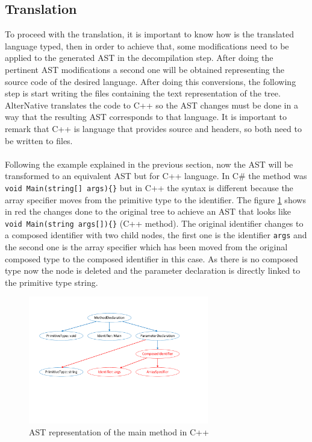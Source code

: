 \subsection{Translation}\label{SS:AN-Process-Translation}
To proceed with the translation, it is important to know how is the translated language typed, then in order to achieve that, some modifications need to be applied to the generated AST in the decompilation step. After doing the pertinent AST modifications a second one will be obtained representing the source code of the desired language. After doing this conversions, the following step is start writing the files containing the text representation of the tree. AlterNative translates the code to C++ so the AST changes must be done in a way that the resulting AST corresponds to that language. It is important to remark that C++ is language that provides source and headers, so both need to be written to files.
\\
\\
Following the example explained in the previous section, now the AST will be transformed to an equivalent AST but for C++ language. In C\# the method was \verb!void Main(string[] args){}! but in C++ the syntax is different because the array specifier moves from the primitive type to the identifier. The figure \ref{fig:AN-AST-Conversions} shows in red the changes done to the original tree to achieve an AST that looks like \verb!void Main(string args[]){}! (C++ method). The original identifier changes to a composed identifier with two child nodes, the first one is the identifier \verb!args! and the second one is the array specifier which has been moved from the original composed type to the composed identifier in this case. As there is no composed type now the node is deleted and the parameter declaration is directly linked to the primitive type string.
\begin{figure}[H]\begin{center}
 \centering
  \captionsetup{justification=centering}
  \includegraphics[width=0.7\textwidth]{pictures/alternative/ast_conversions_cpp}
  \caption{AST representation of the main method in C++\label{fig:AN-AST-Conversions}}
\end{center}\end{figure}

